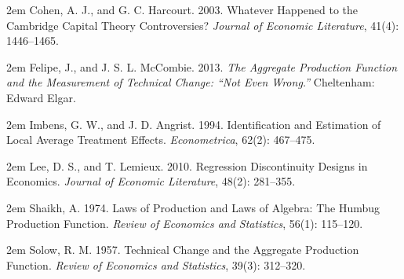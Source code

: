 \documentclass[12pt,a4paper]{ctexart}
\begin{document}
{\footnotesize\noindent\hangindent 2em Cohen, A. J., and G. C. Harcourt. 2003. Whatever Happened to the Cambridge Capital Theory Controversies? \emph{Journal of Economic Literature}, 41(4): 1446–1465.\par}

{\footnotesize\noindent\hangindent 2em Felipe, J., and J. S. L. McCombie. 2013. \emph{The Aggregate Production Function and the Measurement of Technical Change: “Not Even Wrong.”} Cheltenham: Edward Elgar.\par}

{\footnotesize\noindent\hangindent 2em Imbens, G. W., and J. D. Angrist. 1994. Identification and Estimation of Local Average Treatment Effects. \emph{Econometrica}, 62(2): 467–475.\par}

{\footnotesize\noindent\hangindent 2em Lee, D. S., and T. Lemieux. 2010. Regression Discontinuity Designs in Economics. \emph{Journal of Economic Literature}, 48(2): 281–355.\par}

{\footnotesize\noindent\hangindent 2em Shaikh, A. 1974. Laws of Production and Laws of Algebra: The Humbug Production Function. \emph{Review of Economics and Statistics}, 56(1): 115–120.\par}

{\footnotesize\noindent\hangindent 2em Solow, R. M. 1957. Technical Change and the Aggregate Production Function. \emph{Review of Economics and Statistics}, 39(3): 312–320.\par}
\end{document}
